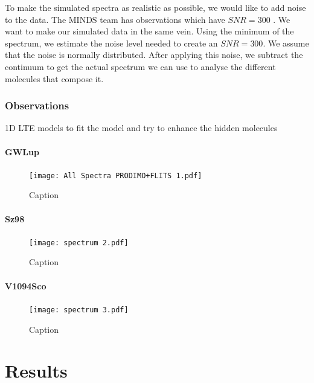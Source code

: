 \documentclass[twoside,single, authoryear, semicolon]{lion-msc}
\begin{document}
To make the simulated spectra as realistic as possible, we would like to add noise to the data. The MINDS team has observations which have $SNR = 300$ \citep{SOURCE}. We want to make our simulated data in the same vein. Using the minimum of the spectrum, we estimate the noise level needed to create an $SNR = 300$. We assume that the noise is normally distributed. After applying this noise, we subtract the continuum to get the actual spectrum we can use to analyse the different molecules that compose it. 

\subsection{Observations}
1D LTE models to fit the model and try to enhance the hidden molecules
\subsubsection{GWLup}
\begin{figure}[!ht]
    \centering
    \texttt{[image: All Spectra PRODIMO+FLITS 1.pdf]}
    \caption{Caption}
    \label{fig:enter-label}
\end{figure}

\subsubsection{Sz98}
\begin{figure}[!ht]
    \centering
    \texttt{[image: spectrum 2.pdf]}
    \caption{Caption}
    \label{fig:enter-label}
\end{figure}
\subsubsection{V1094Sco}
\begin{figure}[!ht]
    \centering
    \texttt{[image: spectrum 3.pdf]}
    \caption{Caption}
    \label{fig:enter-label}
\end{figure}
\chapter{Results}
\end{document}
